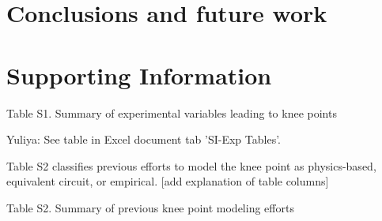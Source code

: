 \documentclass{article}
\begin{document}
\section{Conclusions and future work}

\section{Supporting Information}

 


Table S1. Summary of experimental variables leading to knee points


Yuliya: See table in Excel document tab 'SI-Exp Tables'. 


Table S2 classifies previous efforts to model the knee point as physics-based, equivalent circuit, or empirical. [add explanation of table columns]

Table S2. Summary of previous knee point modeling efforts



\end{document}
